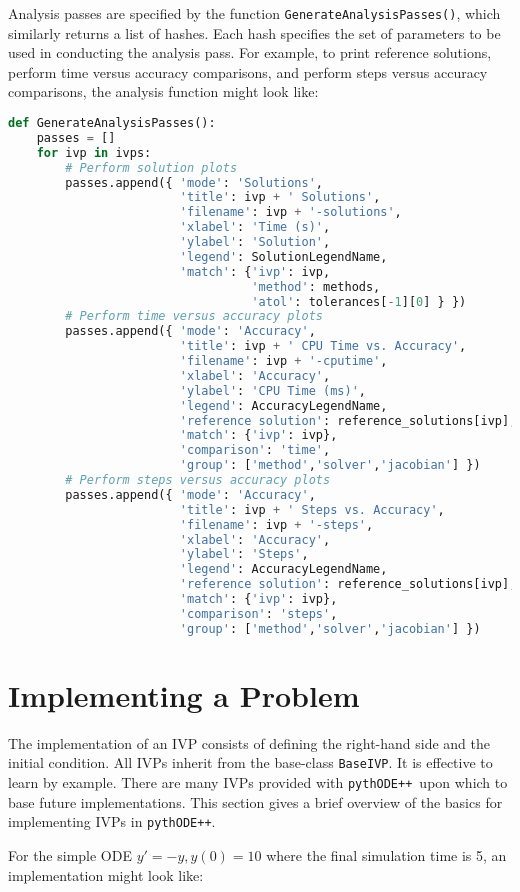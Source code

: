 \documentclass[11pt]{article}
\newcommand{\pypp}{\texttt{pythODE++}}
\begin{document}
Analysis passes are specified by the function
\verb=GenerateAnalysisPasses()=, which similarly returns a list of
hashes. Each hash specifies the set of parameters to be used in
conducting the analysis pass. For example, to print reference
solutions, perform time versus accuracy comparisons, and perform steps
versus accuracy comparisons, the analysis function might look like:
\begin{lstlisting}[tabsize=4,language=Python]
def GenerateAnalysisPasses():
	passes = []
	for ivp in ivps:
		# Perform solution plots
		passes.append({ 'mode': 'Solutions',
						'title': ivp + ' Solutions',
						'filename': ivp + '-solutions',
						'xlabel': 'Time (s)',
						'ylabel': 'Solution',
						'legend': SolutionLegendName,
						'match': {'ivp': ivp,
								  'method': methods,
								  'atol': tolerances[-1][0] } })
		# Perform time versus accuracy plots
		passes.append({ 'mode': 'Accuracy',
						'title': ivp + ' CPU Time vs. Accuracy',
						'filename': ivp + '-cputime',
						'xlabel': 'Accuracy',
						'ylabel': 'CPU Time (ms)',
						'legend': AccuracyLegendName,
						'reference solution': reference_solutions[ivp],
						'match': {'ivp': ivp},
						'comparison': 'time',
						'group': ['method','solver','jacobian'] })
		# Perform steps versus accuracy plots
		passes.append({ 'mode': 'Accuracy',
						'title': ivp + ' Steps vs. Accuracy',
						'filename': ivp + '-steps',
						'xlabel': 'Accuracy',
						'ylabel': 'Steps',
						'legend': AccuracyLegendName,
						'reference solution': reference_solutions[ivp],
						'match': {'ivp': ivp},
						'comparison': 'steps',
						'group': ['method','solver','jacobian'] })
\end{lstlisting}


\section{Implementing a Problem}

The implementation of an IVP consists of defining the right-hand side
and the initial condition. All IVPs inherit from the base-class
\verb=BaseIVP=. It is effective to learn by example. There are many IVPs
provided with \pypp\ upon which to base future implementations. This
section gives a brief overview of the basics for implementing IVPs in
\pypp.

For the simple ODE $y'=-y, y(0)=10$ where the final simulation time is
5, an implementation might look like:
\end{document}
